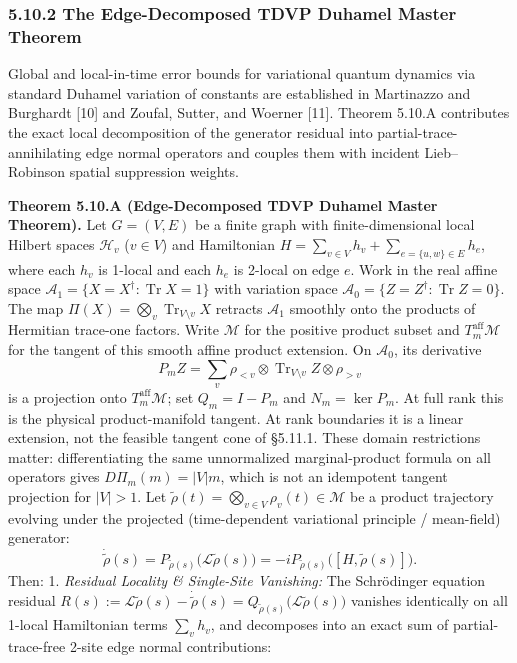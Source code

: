 \documentclass[
  11pt,
]{article}
\begin{document}
\subsubsection{5.10.2 The Edge-Decomposed TDVP Duhamel Master Theorem}\label{the-edge-decomposed-tdvp-duhamel-master-theorem}

Global and local-in-time error bounds for variational quantum dynamics via standard Duhamel variation of constants are established in Martinazzo and Burghardt {[}10{]} and Zoufal, Sutter, and Woerner {[}11{]}. Theorem 5.10.A contributes the exact local decomposition of the generator residual into partial-trace-annihilating edge normal operators and couples them with incident Lieb--Robinson spatial suppression weights.

\textbf{Theorem 5.10.A (Edge-Decomposed TDVP Duhamel Master Theorem).} Let \(G=(V,E)\) be a finite graph with finite-dimensional local Hilbert spaces \(\mathcal{H}_v\) (\(v\in V\)) and Hamiltonian \(H = \sum_{v\in V} h_v + \sum_{e=\{u,w\}\in E} h_e\), where each \(h_v\) is 1-local and each \(h_e\) is 2-local on edge \(e\). Work in the real affine space \(\mathcal A_1=\{X=X^\dagger:\operatorname{Tr}X=1\}\) with variation space \(\mathcal A_0=\{Z=Z^\dagger:\operatorname{Tr}Z=0\}\). The map \(\Pi(X)=\bigotimes_v\operatorname{Tr}_{V\setminus v}X\) retracts \(\mathcal A_1\) smoothly onto the products of Hermitian trace-one factors. Write \(\mathcal M\) for the positive product subset and \(T_m^{\mathrm{aff}}\mathcal M\) for the tangent of this smooth affine product extension. On \(\mathcal A_0\), its derivative
\[
P_m Z=\sum_v\rho_{<v}\otimes\operatorname{Tr}_{V\setminus v}Z\otimes\rho_{>v}
\]
is a projection onto \(T_m^{\mathrm{aff}}\mathcal M\); set \(Q_m=I-P_m\) and \(N_m=\ker P_m\). At full rank this is the physical product-manifold tangent. At rank boundaries it is a linear extension, not the feasible tangent cone of §5.11.1. These domain restrictions matter: differentiating the same unnormalized marginal-product formula on all operators gives \(D\Pi_m(m)=|V|m\), which is not an idempotent tangent projection for \(|V|>1\).
Let \(\widetilde{\rho}(t) = \bigotimes_{v\in V} \rho_v(t) \in \mathcal{M}\) be a product trajectory evolving under the projected (time-dependent variational principle / mean-field) generator:
\[
\dot{\widetilde{\rho}}(s) = P_{\widetilde{\rho}(s)}\bigl(\mathcal{L}\widetilde{\rho}(s)\bigr) = -i P_{\widetilde{\rho}(s)}\bigl([H, \widetilde{\rho}(s)]\bigr).
\]
Then:
1. \emph{Residual Locality \& Single-Site Vanishing:} The Schrödinger equation residual \(R(s) := \mathcal{L}\widetilde{\rho}(s) - \dot{\widetilde{\rho}}(s) = Q_{\widetilde{\rho}(s)}\bigl(\mathcal{L}\widetilde{\rho}(s)\bigr)\) vanishes identically on all 1-local Hamiltonian terms \(\sum_v h_v\), and decomposes into an exact sum of partial-trace-free 2-site edge normal contributions:
\end{document}
